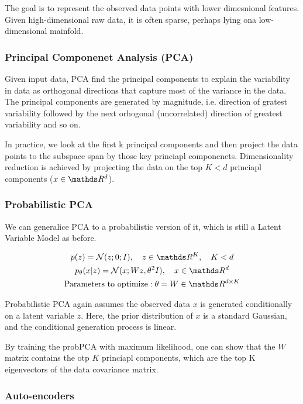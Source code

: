 \documentclass[11pt]{article}
\begin{document}
The goal is to represent the observed data points with lower dimesnional features. Given high-dimensional raw data, it is often sparse, perhaps lying ona  low-dimensional mainfold.

\subsubsection{Principal Componenet Analysis (PCA)}\label{sect:Principal Componenet Analysis (PCA)}

Given input data, PCA find the principal components to explain the variability in data as orthogonal directions that capture most of the variance in the data. The principal components are generated by magnitude, i.e. direction of gratest variability followed by the next orhogonal (uncorrelated) direction of greatest variability and so on.

In practice, we look at the first k principal components and then project the data points to the subspace span by those key princiapl componenets. Dimensionality reduction is achieved by projecting the data on the top $K < d$ princiapl components ($x\in \R^d$).

\subsubsection{Probabilistic PCA}\label{sect:Probabilistic PCA}

We can generalice PCA to a probabilistic version of it, which is still a Latent Variable Model as before.

\begin{gather}
    p(z) = \mathcal{N}(z; 0; I), \quad z \in \R^K, \quad K < d \\
    p_\theta(x|z) = \mathcal{N}(x;Wz, \theta^2 I), \quad x \in \R^d \\
    \nonumber \text{Parameters to optimize}: \theta = W \in \R^{d \times K}
\end{gather}

Probabilistic PCA again assumes the observed data $x$ is generated conditionally on a latent variable $z$. Here, the prior distribution of $x$ is a standard Gaussian, and the conditional generation process is linear.

By training the probPCA with maximum likelihood, one can show that the $W$ matrix contains the otp $K$ princiapl components, which are the top K eigenvectors of the data covariance matrix.

\subsubsection{Auto-encoders}\label{sect:Auto-encoders}
\end{document}
